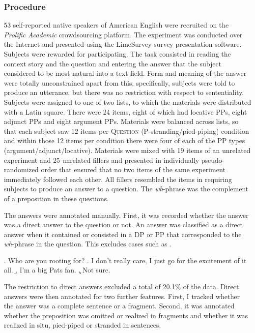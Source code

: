 \subsubsection{Procedure} 
53 self-reported native speakers of American English were recruited on the \textit{Prolific Academic} crowdsourcing platform. The experiment was conducted over the Internet and presented using the LimeSurvey survey presentation software. Subjects were rewarded  for participating. The task consisted in reading the context story and the question and entering the answer that the subject considered to be most natural into a text field. Form and meaning of the answer were totally unconstrained apart from this; specifically, subjects were told to produce an utterance, but there was no restriction with respect to sententiality. Subjects were assigned to one of two lists, to which the materials were distributed with a Latin square. There were 24 items, eight of which had locative PPs, eight adjunct PPs and eight argument PPs. Materials were balanced across lists, so that each subject saw 12 items per \textsc{Question} (P-stranding/pied-piping) condition and within those 12 items per condition there were four of each of the PP types (argument\slash adjunct\slash locative). Materials were mixed with 19 items of an unrelated experiment and 25 unrelated fillers and presented in individually pseudo-randomized order that ensured that no two items of the same experiment immediately followed each other. All fillers resembled the items in requiring subjects to produce an answer to a question. The \textit{wh}-phrase was the complement of a preposition in these questions.

The answers were annotated manually. First, it was recorded whether the answer was a direct answer to the question or not. An answer was classified as a direct answer when it contained or consisted in a DP or PP that corresponded to the \textit{wh}-phrase in the question. This excludes cases such as \Next.

\ex. Who are you rooting for?
\a. I don't really care, I just go for the excitement of it all. 
     \b. I'm a big Pats fan.
     \c. Not sure.
     
The restriction to direct answers excluded a total of 20.1\% of the data. Direct answers were then annotated for two further features. First, I tracked whether the answer was a complete sentence or a fragment. Second, it was annotated whether the preposition was omitted or realized in fragments and whether it was realized in situ, pied-piped or stranded in sentences.

